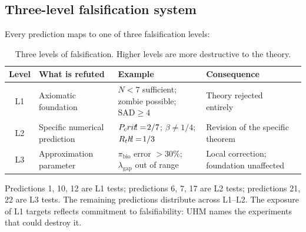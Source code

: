 \subsection{Three-level falsification system}

Every prediction maps to one of three falsification levels:

\begin{table}[H]
\centering
\caption{Three levels of falsification. Higher levels are more destructive to the theory.}
\label{tab:falsification-levels}
\small
\begin{tabular}{@{}clp{3.7cm}p{4.5cm}p{3.5cm}@{}}
\toprule
\textbf{Level} & \textbf{What is refuted} & \textbf{Example} & \textbf{Consequence} \\
\midrule
L1 & Axiomatic foundation & $N < 7$ sufficient; zombie possible; $\mathrm{SAD}\geq 4$ & Theory rejected entirely \\
L2 & Specific numerical prediction & $P_crit\!!=\!2/7$; $\beta\!\neq\!1/4$; $R_th\!!=\!1/3$ & Revision of the specific theorem \\
L3 & Approximation parameter & $\pi_{\mathrm{bio}}$ error $> 30\%$; $\lambda_{\mathrm{gap}}$ out of range & Local correction; foundation unaffected \\
\bottomrule
\end{tabular}
\end{table}

\noindent
Predictions 1, 10, 12 are L1 tests; predictions 6, 7, 17 are L2 tests; predictions 21, 22
are L3 tests. The remaining predictions distribute across L1--L2. The exposure of
L1 targets reflects commitment to falsifiability:
UHM names the experiments that could destroy it.
